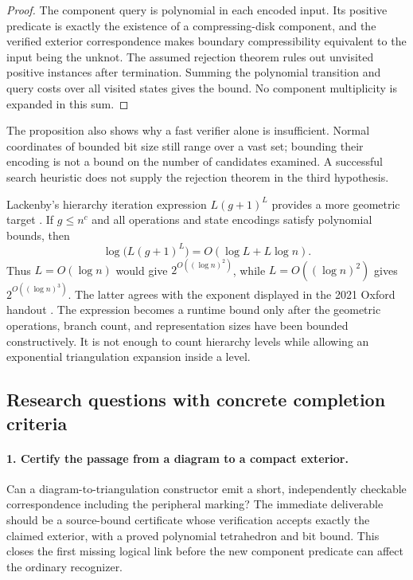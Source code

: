 \begin{proof}
The component query is polynomial in each encoded input.  Its positive
predicate is exactly the existence of a compressing-disk component, and
the verified exterior correspondence makes boundary compressibility
equivalent to the input being the unknot.  The assumed rejection theorem
rules out unvisited positive instances after termination.  Summing the
polynomial transition and query costs over all visited states gives the
bound.  No component multiplicity is expanded in this sum.
\end{proof}

The proposition also shows why a fast verifier alone is insufficient.
Normal coordinates of bounded bit size still range over a vast set; bounding
their encoding is not a bound on the number of candidates examined.  A
successful search heuristic does not supply the rejection theorem in the
third hypothesis.

Lackenby's hierarchy iteration expression $L(g+1)^L$ provides a more
geometric target \cite{Lackenby2026}.  If $g\leq n^c$ and all operations
and state encodings satisfy polynomial bounds, then
\[
 \log\bigl(L(g+1)^L\bigr)=O(\log L+L\log n).
\]
Thus $L=O(\log n)$ would give $2^{O((\log n)^2)}$, while
$L=O((\log n)^2)$ gives $2^{O((\log n)^3)}$.  The latter agrees with the
exponent displayed in the 2021 Oxford handout \cite{Lackenby2021}.
The expression becomes a runtime bound only after the geometric operations,
branch count, and representation sizes have been bounded constructively.
It is not enough to count hierarchy levels while allowing an exponential
triangulation expansion inside a level.

\subsection{Research questions with concrete completion criteria}

\paragraph{1. Certify the passage from a diagram to a compact exterior.}
Can a diagram-to-triangulation constructor emit a short, independently
checkable correspondence including the peripheral marking?  The immediate
deliverable should be a source-bound certificate whose verification accepts
exactly the claimed exterior, with a proved polynomial tetrahedron and bit
bound.  This closes the first missing logical link before the new component
predicate can affect the ordinary recognizer.

